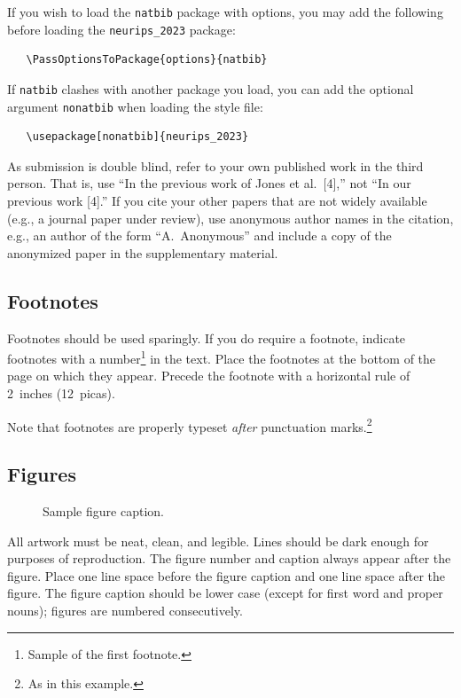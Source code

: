 \documentclass{article}
\begin{document}
If you wish to load the \verb+natbib+ package with options, you may add the
following before loading the \verb+neurips_2023+ package:
\begin{verbatim}
   \PassOptionsToPackage{options}{natbib}
\end{verbatim}


If \verb+natbib+ clashes with another package you load, you can add the optional
argument \verb+nonatbib+ when loading the style file:
\begin{verbatim}
   \usepackage[nonatbib]{neurips_2023}
\end{verbatim}


As submission is double blind, refer to your own published work in the third
person. That is, use ``In the previous work of Jones et al.\ [4],'' not ``In our
previous work [4].'' If you cite your other papers that are not widely available
(e.g., a journal paper under review), use anonymous author names in the
citation, e.g., an author of the form ``A.\ Anonymous'' and include a copy of the anonymized paper in the supplementary material.


\subsection{Footnotes}


Footnotes should be used sparingly.  If you do require a footnote, indicate
footnotes with a number\footnote{Sample of the first footnote.} in the
text. Place the footnotes at the bottom of the page on which they appear.
Precede the footnote with a horizontal rule of 2~inches (12~picas).


Note that footnotes are properly typeset \emph{after} punctuation
marks.\footnote{As in this example.}


\subsection{Figures}


\begin{figure}
  \centering
  \fbox{\rule[-.5cm]{0cm}{4cm} \rule[-.5cm]{4cm}{0cm}}
  \caption{Sample figure caption.}
\end{figure}


All artwork must be neat, clean, and legible. Lines should be dark enough for
purposes of reproduction. The figure number and caption always appear after the
figure. Place one line space before the figure caption and one line space after
the figure. The figure caption should be lower case (except for first word and
proper nouns); figures are numbered consecutively.
\end{document}
